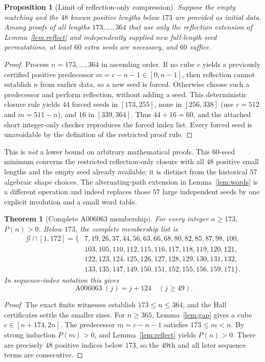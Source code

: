 \documentclass[10pt]{article}
\newtheorem{theorem}{Theorem}
\newtheorem{proposition}{Proposition}
\newcommand{\good}{\mathcal{G}}
\begin{document}
\begin{proposition}[Limit of reflection-only compression]\label{prop:atoms}
Suppose the empty matching and the $48$ known positive
lengths below $173$ are provided as initial data. Among proofs of all lengths
$173,\dots,364$ that use only the reflection extension
of Lemma~\ref{lem:reflect} and independently supplied
new full-length seed permutations, at least $60$
extra seeds are necessary, and $60$ suffice.
\end{proposition}
\begin{proof}
Process $n=173,\dots,364$ in ascending order. If no
cube $c$ yields a previously certified positive
predecessor $m=c-n-1\in[0,n-1]$, then reflection
cannot establish $n$ from earlier data, so a new seed
is forced. Otherwise choose such a predecessor and
perform reflection, without adding a seed.
This deterministic closure rule yields $44$ forced
seeds in $[173,255]$, none in $[256,338]$ (use
$c=512$ and $m=511-n$), and $16$ in $[339,364]$.
Thus $44+16=60$, and the attached short
integer-only checker reproduces the forced
index list. Every forced seed is unavoidable by
the definition of the restricted proof rule.
\end{proof}
This is \emph{not} a lower bound on arbitrary
mathematical proofs. This $60$-seed minimum concerns the
restricted reflection-only closure with all $48$ positive
small lengths and the empty seed already available; it is
distinct from the historical $57$ algebraic shape choices.
The alternating-path
extension in Lemma~\ref{lem:words} is a different
operation and indeed replaces those $57$ large
independent seeds by one explicit involution
and a small word table.

\begin{theorem}[Complete A006063 membership]\label{thm:exist}
For every integer $n\ge173$, $P(n)>0$.
Below $173$, the complete membership list is
\begin{align*}
\good\cap[1,172]=\{&
7,19,26,37,44,56,63,66,68,80,82,85,87,98,100,\\
&103,105,110,112,115,116,117,118,119,120,121,\\
&122,123,124,125,126,127,128,129,130,131,132,\\
&133,135,147,149,150,151,152,155,156,159,171\}.
\end{align*}
In sequence-index notation this gives
\[
\boxed{\operatorname{A006063}(j)=j+124\quad(j\ge49).}
\]
\end{theorem}
\begin{proof}
The exact finite witnesses establish $173\le n\le364$,
and the Hall certificates settle the smaller sizes.
For $n\ge365$, Lemma~\ref{lem:gap} gives a cube
$c\in[n+174,2n]$. The predecessor
$m=c-n-1$ satisfies $173\le m<n$.
By strong induction $P(m)>0$, and
Lemma~\ref{lem:reflect} yields $P(n)>0$.
There are precisely $48$ positive indices below $173$,
so the $49$th and all later sequence terms are consecutive.
\end{proof}
\end{document}
